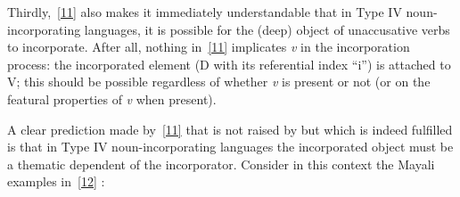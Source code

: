 \documentclass[output=paper]{langsci/langscibook}
\begin{document}
\begin{refcontext}
Thirdly,~\eqref{11} also makes it immediately understandable that in Type IV
noun-incorporating languages, it is possible for the (deep) object of
unaccusative verbs to incorporate. After all, nothing in~\eqref{11} implicates
\emph{v} in the incorporation process: the incorporated element (D with its
referential index \enquote{i}) is attached to V; this should be possible regardless
of whether \emph{v} is present or not (or on the featural properties of
\emph{v} when present).

A clear prediction made by~\eqref{11} that is not raised by \cite{bakeretal05}
but which is indeed fulfilled is that in Type IV noun-incorporating languages
the incorporated object must be a thematic dependent of the incorporator.
Consider in this context the Mayali examples in~\eqref{12} \citep{evans94}:


\end{refcontext}
\end{document}
